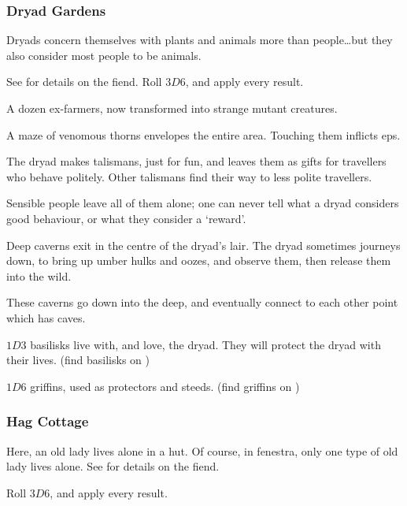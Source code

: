 \begin{multicols}{2}
\subsubsection{Dryad Gardens}
\label{dryadPoint}

Dryads concern themselves with plants and animals more than people\ldots but they also consider most people to be animals.

See  for details on the fiend.
Roll $3D6$, and apply every result.

\begin{dlist}
  \item
  A dozen ex-farmers, now transformed into strange mutant creatures.
  \item
  A maze of venomous thorns envelopes the entire area.
  Touching them inflicts \glspl{ep}.
  \item
  The dryad makes \glspl{talisman}, just for fun, and leaves them as gifts for travellers who behave politely.
  Other \glspl{talisman} find their way to less polite travellers.

  Sensible people leave all of them alone; one can never tell what a dryad considers good behaviour, or what they consider a `reward'.
  \item
  Deep caverns exit in the centre of the dryad's lair.
  The dryad sometimes journeys down, to bring up umber hulks and oozes, and observe them, then release them into the wild.

  These caverns go down into the \gls{deep}, and eventually connect to each other point which has caves.
  \item
  $1D3$ \glspl{basilisk} live with, and love, the dryad.
  They will protect the dryad with their lives.
  (find \glspl{basilisk} on )
  \item
  $1D6$ griffins, used as protectors and steeds.
  (find griffins on )
\end{dlist}

\subsubsection{Hag Cottage}
\label{hagPoint}

Here, an old lady lives alone in a hut.
Of course, in \gls{fenestra}, only one type of old lady lives alone.
See  for details on the fiend.

Roll $3D6$, and apply every result.


\end{multicols}
